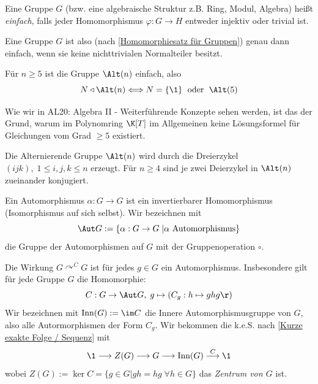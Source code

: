 \documentclass[11pt, a4paper]{article}
\begin{document}
\begin{definition}[Einfach]
    Eine Gruppe $G$ (bzw. eine algebraische Struktur z.B. Ring, Modul, Algebra) heißt \emph{einfach}, falls jeder Homomorphismus $\varphi: G\to H$ entweder injektiv oder trivial ist.
\end{definition}

\begin{note}
    Eine Gruppe $G$ ist also (nach \ref{Homomorphiesatz für Gruppen}) genau dann einfach, wenn sie keine nichttrivialen Normalteiler besitzt. 
\end{note}

\begin{theorem} Für $n\geq 5$ ist die Gruppe $\Alt(n)$ einfach, also 
$$N \triangleleft \Alt(n) \Longleftrightarrow N = \{\1\}\; \text{ oder } \; \Alt(5)$$
\end{theorem}

\begin{note}
    Wie wir in AL20: Algebra II - Weiterführende Konzepte sehen werden, ist das der Grund, warum im Polynomring $\K[T]$ im Allgemeinen keine Lösungsformel für Gleichungen vom Grad $\geq 5$ existiert.
\end{note}

\begin{lemma}
Die Alternierende Gruppe $\Alt(n)$ wird durch die Dreierzykel $(ijk), \; 1\leq i,j,k \leq n$ erzeugt. Für $n\geq 4$ sind je zwei Deierzykel in $\Alt(n)$ zueinander konjugiert.
\end{lemma}

\begin{definition} Ein Automorphismus $\alpha: G\to G$ ist ein invertierbarer Homomorphismus (Isomorphismus auf sich selbst). Wir bezeichnen mit $$\Aut G := \{\alpha: G\to G\; | \alpha \text{ Automorphismus}\}$$
die Gruppe der Automorphismen auf $G$ mit der Gruppenoperation $\circ$.
\end{definition}

\begin{lemma} Die Wirkung $G\curvearrowright^C G$ ist für jedes $g\in G$ ein Automorphismus. Insbesondere gilt für jede Gruppe $G$ die Homomorphie:
$$C: G\to \Aut G, \; g\mapsto (C_g: h \mapsto ghg\r)$$
Wir bezeichnen mit $\mathrm{Inn}(G):=\im C$ die Innere Automorphismusgruppe von $G$, also alle Autormorphismen der Form $C_g$. Wir bekommen die k.e.S. nach \ref{Kurze exakte Folge / Sequenz} mit
$$\1 \longrightarrow Z(G) \longrightarrow G \longrightarrow \mathrm{Inn}(G)\overset{C}{\longrightarrow} \1$$
wobei $Z(G):= \ker C = \{ g\in G | gh = hg \; \forall h\in G\}$ das \emph{Zentrum von $G$} ist.
\end{lemma}
\end{document}
